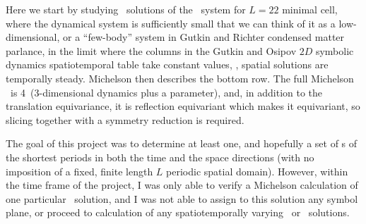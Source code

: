 
Here we start by studying \reqv\ solutions of the \KS\ system for $L=22$ minimal
cell, where  the dynamical system is sufficiently small
that we can think of it as a low-dimensional, or a ``few-body'' system in
Gutkin and Richter condensed matter
parlance, in the limit where the columns in the Gutkin and Osipov %
$2D$ symbolic dynamics spatiotemporal table
take constant values, \ie, spatial solutions are temporally steady.
Michelson then describes the bottom row. The full Michelson \statesp\
is 4\dmn\ (3-dimensional dynamics plus a parameter), and, in addition to the
translation equivariance, it is reflection equivariant which makes it \On{2}
equivariant, so slicing together with a \Zn{2} symmetry reduction is required.

The goal of this project was to determine at least one, and hopefully a set of
{\rpo}s of the shortest periods in both the time and the space directions (with
no imposition of a fixed, finite length $L$ periodic spatial domain). However,
within the time frame of the project, I was only able to verify a Michelson
calculation of one particular \reqv\ solution, and I was not able to assign to
this solution any symbol plane, or proceed to calculation of any
spatiotemporally varying \po\ or \rpo\ solutions.
